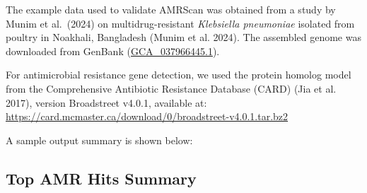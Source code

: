 \documentclass[
]{article}
\begin{document}
The example data used to validate AMRScan was obtained from a study by
Munim et al.~(2024) on multidrug-resistant \emph{Klebsiella pneumoniae}
isolated from poultry in Noakhali, Bangladesh (Munim et al. 2024). The
assembled genome was downloaded from GenBank
(\href{https://www.ncbi.nlm.nih.gov/assembly/GCA_037966445.1}{GCA\_037966445.1}).

For antimicrobial resistance gene detection, we used the protein homolog
model from the Comprehensive Antibiotic Resistance Database (CARD) (Jia
et al. 2017), version Broadstreet v4.0.1, available at:\\
\url{https://card.mcmaster.ca/download/0/broadstreet-v4.0.1.tar.bz2}

A sample output summary is shown below:

\subsection{Top AMR Hits Summary}\label{top-amr-hits-summary}

\begingroup
\small  %
\end{document}
